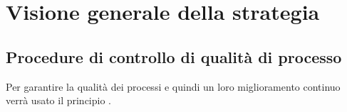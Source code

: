 
\section{Visione generale della strategia}

\subsection{Procedure di controllo di qualità di processo}
Per garantire la qualità dei processi e quindi un loro miglioramento continuo verrà usato il principio .